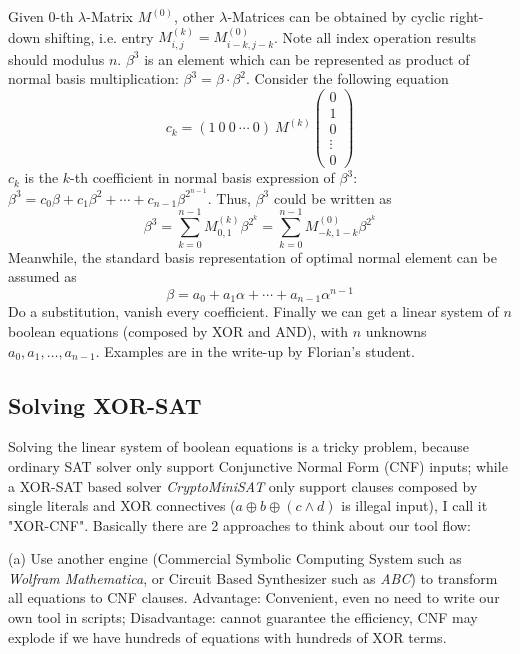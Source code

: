 \documentclass{acm_proc_article-sp}
\begin{document}
Given 0-th $\lambda$-Matrix $M^{(0)}$, other $\lambda$-Matrices can be obtained by cyclic right-down shifting, i.e. entry $M_{i,j}^{(k)} = M_{i-k,j-k}^{(0)}$. Note all
index operation results should modulus $n$. $\beta^3$ is an element which can be represented as product of normal basis multiplication: $\beta^3 = \beta\cdot\beta^2$.
Consider the following equation
\begin{displaymath}
c_k = (1\  0\ 0\ \cdots\ 0)\  M^{(k)} \left(
\begin{array} {lcr}
0\\
1\\
0\\
\vdots\\
0
\end{array} \right)
\end{displaymath}
$c_k$ is the $k$-th coefficient in normal basis expression of $\beta^3$: $\beta^3 = c_0\beta + c_1\beta^2 + \cdots + c_{n-1}\beta^{2^{n-1}}$.
Thus, $\beta^3$ could be written as
\begin{displaymath}
\beta^3 = \sum_{k=0}^{n-1} M_{0,1}^{(k)}\beta^{2^k} = \sum_{k=0}^{n-1} M_{-k,1-k}^{(0)}\beta^{2^k}
\end{displaymath}
Meanwhile, the standard basis representation of optimal normal element can be assumed as
\begin{displaymath}
\beta = a_0 + a_1\alpha + \cdots + a_{n-1}\alpha^{n-1}
\end{displaymath}
Do a substitution, vanish every coefficient. Finally we can get a linear system of $n$ boolean equations (composed by XOR and AND), with $n$ unknowns $a_0,a_1,\dots,a_{n-1}$. 
Examples are in the write-up by Florian's student.

\subsection{Solving XOR-SAT}
Solving the linear system of boolean equations is a tricky problem, because ordinary SAT solver only support Conjunctive Normal Form (CNF) inputs; while a XOR-SAT based solver 
\emph{CryptoMiniSAT} only support clauses composed by single literals and XOR connectives ($a\oplus b \oplus (c\land d)$ is illegal input), I call it "XOR-CNF". Basically there are 2 approaches 
to think about our tool flow:

(a) Use another engine (Commercial Symbolic Computing System such as \emph{Wolfram Mathematica}, or Circuit Based Synthesizer such as \emph{ABC}) to transform all equations to CNF clauses.
Advantage: Convenient, even no need to write our own tool in scripts; Disadvantage: cannot guarantee the efficiency, CNF may explode if we have hundreds of equations with hundreds of 
XOR terms.
\end{document}
